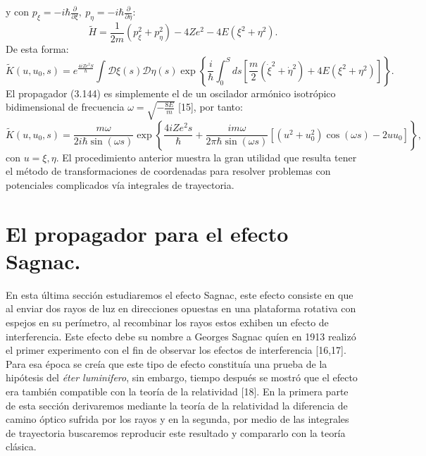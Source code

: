 y con $	p_{\xi}=-i\hbar\frac{\partial}{\partial\xi},\ p_{\eta}=-i\hbar\frac{\partial}{\partial\eta} $:
\begin{equation}
\tilde{H}=\frac{1}{2m}\left(p_{\xi}^{2}+p_{\eta}^{2}\right)-4Ze^{2}-4E(\xi^{2}+\eta^{2}).
\end{equation}
De esta forma:
\begin{equation}
\tilde{K}(u,u_{0},s)=e^{\frac{4iZe^{2}S}{\hbar}}\int\mathcal{D}\xi(s)\mathcal{D}\eta(s)\exp\left\{ \frac{i}{\hbar}\int_{0}^{S}ds\left[\frac{m}{2}(\dot{\xi}^{2}+\dot{\eta}^{2})+4E(\xi^{2}+\eta^{2})\right]\right\} .
\end{equation} 
El propagador (3.144) es simplemente el de un oscilador armónico isotrópico bidimensional de frecuencia $\omega=\sqrt{-\frac{8E}{m}}$ [15], por tanto:
\begin{equation}
\tilde{K}(u,u_{0},s)=\frac{m\omega}{2i\hbar\sin(\omega s)}\exp\left\{ \frac{4iZe^{2}s}{\hbar}+\frac{im\omega}{2\pi\hbar\sin(\omega s)}\left[(u^{2}+u_{0}^{2})\cos(\omega s)-2uu_{0}\right]\right\}, 
\end{equation}
con $u={\xi ,\eta}$. El procedimiento anterior muestra la gran utilidad que resulta tener el método de transformaciones de coordenadas para resolver problemas con potenciales complicados vía integrales de trayectoria.
\newpage






\section{El propagador para el efecto Sagnac.}
En esta última sección estudiaremos el efecto Sagnac, este efecto consiste en que al enviar dos rayos de luz en  direcciones opuestas en una plataforma rotativa con espejos en su perímetro, al recombinar los rayos estos exhiben un efecto de interferencia. Este efecto debe su nombre a Georges Sagnac quíen en 1913 realizó el primer experimento con el fin de observar los efectos de interferencia [16,17]. Para esa época se creía que este tipo de efecto constituía una prueba de la hipótesis del \textit{éter luminifero}, sin embargo, tiempo después se mostró que el efecto era también compatible con la teoría de la relatividad [18]. En la primera parte de esta sección derivaremos mediante la teoría de la relatividad la diferencia de camino óptico sufrida por los rayos y en la segunda, por medio de las integrales de trayectoria buscaremos reproducir este resultado y compararlo con la teoría clásica.
	 
